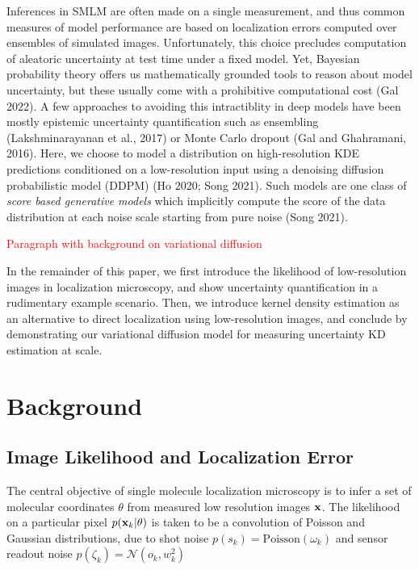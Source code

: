 \documentclass{article}
\begin{document}
Inferences in SMLM are often made on a single measurement, and thus common measures of model performance are based on localization errors computed over ensembles of simulated images. Unfortunately, this choice precludes computation of aleatoric uncertainty at test time under a fixed model. Yet, Bayesian probability theory offers us mathematically grounded tools to reason about model uncertainty, but these usually come with a prohibitive computational cost (Gal 2022). A few approaches to avoiding this intractiblity in deep models have been mostly epistemic uncertainty quantification such as ensembling (Lakshminarayanan et al., 2017) or Monte Carlo dropout (Gal and Ghahramani, 2016). Here, we choose to model a distribution on high-resolution KDE predictions conditioned on a low-resolution input using a denoising diffusion probabilistic model (DDPM) (Ho 2020; Song 2021). Such models are one class of \emph{score based generative models} which implicitly compute the score of the data distribution at each noise scale starting from pure noise (Song 2021). 

\textcolor{red}{Paragraph with background on variational diffusion}

In the remainder of this paper, we first introduce the likelihood of low-resolution images in localization microscopy, and show uncertainty quantification in a rudimentary example scenario. Then, we introduce kernel density estimation as an alternative to direct localization using low-resolution images, and conclude by demonstrating our variational diffusion model for measuring uncertainty KD estimation at scale. 

\section{Background}

\subsection{Image Likelihood and Localization Error}

The central objective of single molecule localization microscopy is to infer a set of molecular coordinates $\theta$ from measured low resolution images $\bold{x}$. The likelihood on a particular pixel $p(\bold{x}_k|\theta)$ is taken to be a convolution of Poisson and Gaussian distributions, due to shot noise $p(s_{k}) = \mathrm{Poisson}(\omega_{k})$ and sensor readout noise $p(\zeta_{k}) = \mathcal{N}(o_{k},w_{k}^{2})$ 
\end{document}
